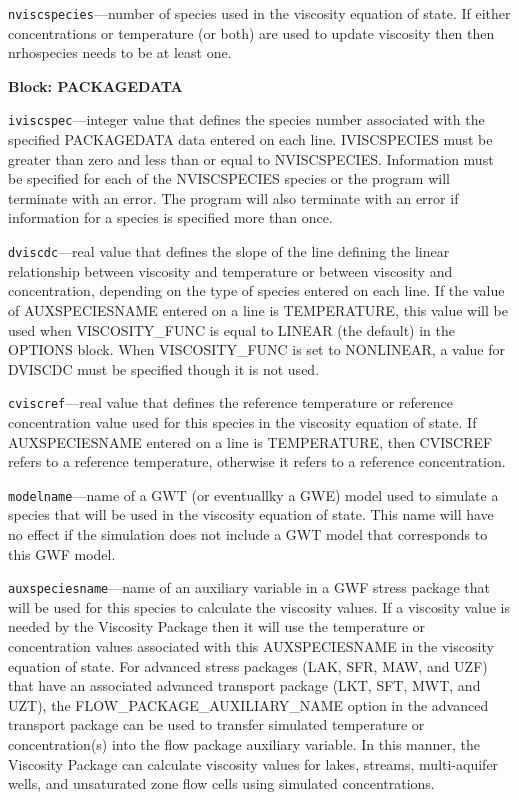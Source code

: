 \begin{description}
\item \texttt{nviscspecies}---number of species used in the viscosity equation of state.  If either concentrations or temperature (or both) are used to update viscosity then then nrhospecies needs to be at least one.

\end{description}
\item \textbf{Block: PACKAGEDATA}

\begin{description}
\item \texttt{iviscspec}---integer value that defines the species number associated with the specified PACKAGEDATA data entered on each line. IVISCSPECIES must be greater than zero and less than or equal to NVISCSPECIES. Information must be specified for each of the NVISCSPECIES species or the program will terminate with an error.  The program will also terminate with an error if information for a species is specified more than once.

\item \texttt{dviscdc}---real value that defines the slope of the line defining the linear relationship between viscosity and temperature or between viscosity and concentration, depending on the type of species entered on each line.  If the value of AUXSPECIESNAME entered on a line is TEMPERATURE, this value will be used when VISCOSITY\_FUNC is equal to LINEAR (the default) in the OPTIONS block.  When VISCOSITY\_FUNC is set to NONLINEAR, a value for DVISCDC must be specified though it is not used.

\item \texttt{cviscref}---real value that defines the reference temperature or reference concentration value used for this species in the viscosity equation of state.  If AUXSPECIESNAME entered on a line is TEMPERATURE, then CVISCREF refers to a reference temperature, otherwise it refers to a reference concentration.

\item \texttt{modelname}---name of a GWT (or eventuallky a GWE) model used to simulate a species that will be used in the viscosity equation of state.  This name will have no effect if the simulation does not include a GWT model that corresponds to this GWF model.

\item \texttt{auxspeciesname}---name of an auxiliary variable in a GWF stress package that will be used for this species to calculate the viscosity values.  If a viscosity value is needed by the Viscosity Package then it will use the temperature or concentration values associated with this AUXSPECIESNAME in the viscosity equation of state.  For advanced stress packages (LAK, SFR, MAW, and UZF) that have an associated advanced transport package (LKT, SFT, MWT, and UZT), the FLOW\_PACKAGE\_AUXILIARY\_NAME option in the advanced transport package can be used to transfer simulated temperature or concentration(s) into the flow package auxiliary variable.  In this manner, the Viscosity Package can calculate viscosity values for lakes, streams, multi-aquifer wells, and unsaturated zone flow cells using simulated concentrations.

\end{description}

